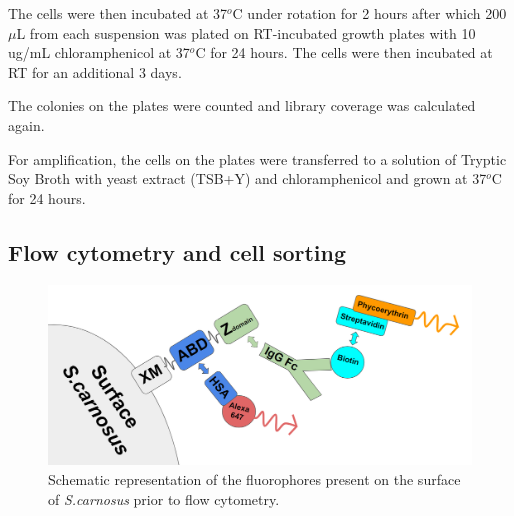 \documentclass{article}
\begin{document}
\begin{multicols}{2}
	The cells were then incubated at 37$^o$C under rotation for 2 hours after which 200 $\mu$L from each suspension was plated on RT-incubated growth plates with 10 ug/mL chloramphenicol at 37$^o$C for 24 hours. The cells were then incubated at RT for an additional 3 days.
	
	The colonies on the plates were counted and library coverage was calculated again.
	
	For amplification, the cells on the plates were transferred to a solution of Tryptic Soy Broth with yeast extract (TSB+Y) and chloramphenicol and grown at 37$^o$C for 24 hours.

    \newpage
    
	\subsection{Flow cytometry and cell sorting}
	\end{multicols}
	\begin{figure}[H]
		\centering
		\includegraphics[width=\linewidth]{images/surface.png}
		\caption{Schematic representation of the fluorophores present on the surface of \textit{S.carnosus} prior to flow cytometry.}
		\label{surface}
	\end{figure}
\end{document}
